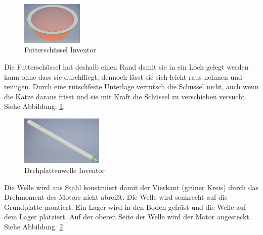 \begin{figure}
\vspace{-20pt}
  \begin{center}
    \includegraphics[width=0.26\textwidth]{Bilder/Inventor/Schuessel}
  \end{center}
  \caption{Futterschüssel Inventor}
  \label{Futterschuessel_Inventor}
  \vspace{-40pt}
\end{figure}

Die Futterschüssel hat deshalb einen Rand damit sie in ein Loch gelegt werden kann ohne dass sie durchfliegt, dennoch lässt sie sich leicht raus nehmen und reinigen. Durch eine rutschfeste Unterlage verrutsch die Schüssel nicht, auch wenn die Katze daraus frisst und sie mit Kraft die Schüssel zu verschieben versucht. \\ Siehe Abbildung: \ref{Futterschuessel_Inventor}. \\


\begin{figure}
\vspace{-20pt}
  \begin{center}
    \includegraphics[width=0.35\textwidth]{Bilder/Inventor/Drehplatte_Welle}
  \end{center}
  \caption{Drehplattenwelle Inventor}
  \label{Drehplatte_Welle_Inventor}
  \vspace{-40pt}
\end{figure}

Die Welle wird aus Stahl konstruiert damit der Vierkant (grüner Kreis) durch das Drehmoment des Motors nicht abreißt. Die Welle wird senkrecht auf die Grundplatte montiert. Ein Lager wird in den Boden gefräst und die Welle auf dem Lager platziert. Auf der oberen Seite der Welle wird der Motor angesteckt. \\ Siehe Abbildung: \ref{Drehplatte_Welle_Inventor} 

